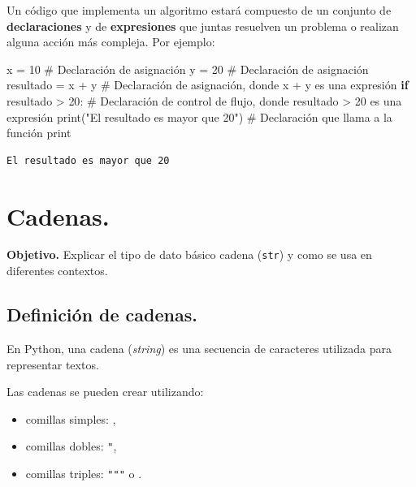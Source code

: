 \documentclass[
  spanish,
  letterpaper,
]{scrbook}
\newenvironment{Shaded}{\begin{snugshade}}{\end{snugshade}}
\newcommand{\BuiltInTok}[1]{\textcolor[rgb]{0.00,0.23,0.31}{#1}}
\newcommand{\CommentTok}[1]{\textcolor[rgb]{0.37,0.37,0.37}{#1}}
\newcommand{\ControlFlowTok}[1]{\textcolor[rgb]{0.00,0.23,0.31}{\textbf{#1}}}
\newcommand{\DecValTok}[1]{\textcolor[rgb]{0.68,0.00,0.00}{#1}}
\newcommand{\NormalTok}[1]{\textcolor[rgb]{0.00,0.23,0.31}{#1}}
\newcommand{\OperatorTok}[1]{\textcolor[rgb]{0.37,0.37,0.37}{#1}}
\newcommand{\StringTok}[1]{\textcolor[rgb]{0.13,0.47,0.30}{#1}}
\providecommand{\tightlist}{%
  \setlength{\itemsep}{0pt}\setlength{\parskip}{0pt}}
\theoremstyle{definition}
\theoremstyle{remark}
\begin{document}
Un código que implementa un algoritmo estará compuesto de un conjunto de
\textbf{declaraciones} y de \textbf{expresiones} que juntas resuelven un
problema o realizan alguna acción más compleja. Por ejemplo:

\begin{Shaded}
\begin{Highlighting}[]
\NormalTok{x }\OperatorTok{=} \DecValTok{10}               \CommentTok{\# Declaración de asignación}
\NormalTok{y }\OperatorTok{=} \DecValTok{20}               \CommentTok{\# Declaración de asignación}
\NormalTok{resultado }\OperatorTok{=}\NormalTok{ x }\OperatorTok{+}\NormalTok{ y    }\CommentTok{\# Declaración de asignación, donde \textasciigrave{}x + y\textasciigrave{} es una expresión}
\ControlFlowTok{if}\NormalTok{ resultado }\OperatorTok{\textgreater{}} \DecValTok{20}\NormalTok{:   }\CommentTok{\# Declaración de control de flujo, donde \textasciigrave{}resultado \textgreater{} 20\textasciigrave{} es una expresión}
    \BuiltInTok{print}\NormalTok{(}\StringTok{"El resultado es mayor que 20"}\NormalTok{)  }\CommentTok{\# Declaración que llama a la función \textasciigrave{}print\textasciigrave{}}
\end{Highlighting}
\end{Shaded}

\begin{verbatim}
El resultado es mayor que 20
\end{verbatim}

\chapter{Cadenas.}\label{sec-e-cadenas}

\textbf{Objetivo.} Explicar el tipo de dato básico cadena (\texttt{str})
y como se usa en diferentes contextos.

\section{Definición de cadenas.}\label{definiciuxf3n-de-cadenas.}

En Python, una cadena (\emph{string}) es una secuencia de caracteres
utilizada para representar textos.

Las cadenas se pueden crear utilizando:

\begin{itemize}
\tightlist
\item
  comillas simples: \texttt{\textquotesingle{}},
\item
  comillas dobles: \texttt{"},
\item
  comillas triples: \texttt{"""} o
  \texttt{\textquotesingle{}\textquotesingle{}\textquotesingle{}}.
\end{itemize}
\end{document}
